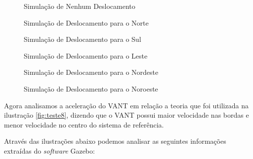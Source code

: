 \begin{figure}[H]
	\centering	
	\caption{Simulação de Nenhum Deslocamento}
	\def\svgwidth{15cm}
	
	\label{fig:00}
\end{figure}

\begin{figure}[H]
	\centering	
	\caption{Simulação de Deslocamento para o Norte}
	\def\svgwidth{15cm}
	
	\label{fig:norte}
\end{figure}

\begin{figure}[H]
	\centering	
	\caption{Simulação de Deslocamento para o Sul}
	\def\svgwidth{15cm}
	
	\label{fig:sul}
\end{figure}

\begin{figure}[H]
	\centering	
	\caption{Simulação de Deslocamento para o Leste}
	\def\svgwidth{15cm}
	
	\label{fig:leste}
\end{figure}

\begin{figure}[H]
	\centering	
	\caption{Simulação de Deslocamento para o Nordeste}
	\def\svgwidth{15cm}
	
	\label{fig:nordeste}
\end{figure} 

\begin{figure}[H]
	\centering	
	\caption{Simulação de Deslocamento para o Noroeste}
	\def\svgwidth{15cm}
	
	\label{fig:noroeste}
\end{figure}

Agora analisamos a aceleração do VANT em relação a teoria que foi utilizada na ilustração \ref{fig:teste8}, dizendo que o VANT possui maior velocidade nas bordas e menor velocidade no centro do sistema de referência.

Através das ilustrações abaixo podemos analisar as seguintes informações extraídas do \textit{software} Gazebo:

